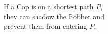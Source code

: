 \documentclass[preview]{standalone}
\begin{document}
\begin{center}
If a Cop is on a shortest path $P$, \\ they can shadow the Robber and \\ prevent them from entering $P$.
\end{center}
\end{document}
